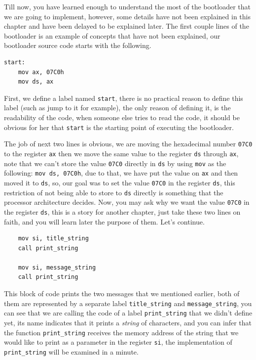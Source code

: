 Till now, you have learned enough to understand the most of the
bootloader that we are going to implement, however, some details have
not been explained in this chapter and have been delayed to be explained
later. The first couple lines of the bootloader is an example of
concepts that have not been explained, our bootloader source code starts
with the following.

\begin{lstlisting}
start:
    mov ax, 07C0h
    mov ds, ax
\end{lstlisting}

First, we define a label named \lstinline!start!, there is no practical
reason to define this label (such as jump to it for example), the only
reason of defining it, is the readability of the code, when someone else
tries to read the code, it should be obvious for her that
\lstinline!start! is the starting point of executing the bootloader.

The job of next two lines is obvious, we are moving the hexadecimal
number \lstinline!07C0! to the register \lstinline!ax! then we move the
same value to the register \lstinline!ds! through \lstinline!ax!, note
that we can't store the value \lstinline!07C0! directly in
\lstinline!ds! by using \lstinline!mov! as the following:
\lstinline!mov ds, 07C0h!, due to that, we have put the value on
\lstinline!ax! and then moved it to \lstinline!ds!, so, our goal was to
set the value \lstinline!07C0! in the register \lstinline!ds!, this
restriction of not being able to store to \lstinline!ds! directly is
something that the processor architecture decides. Now, you may ask why
we want the value \lstinline!07C0! in the register \lstinline!ds!, this
is a story for another chapter, just take these two lines on faith, and
you will learn later the purpose of them. Let's continue.

\begin{lstlisting}
    mov si, title_string
    call print_string
    
    mov si, message_string
    call print_string
\end{lstlisting}

This block of code prints the two messages that we mentioned earlier,
both of them are represented by a separate label
\lstinline!title_string! and \lstinline!message_string!, you can see
that we are calling the code of a label \lstinline!print_string! that we
didn't define yet, its name indicates that it prints a \emph{string} of
characters, and you can infer that the function \lstinline!print_string!
receives the memory address of the string that we would like to print as
a parameter in the register \lstinline!si!, the implementation of
\lstinline!print_string! will be examined in a minute.

